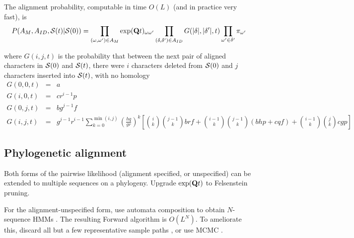 \documentclass{article}
\begin{document}
The alignment probability, computable in time $O(L)$ (and in practice very fast), is
\[
P(A_M,A_{ID},{\cal S}(t)|{\cal S}(0)) =
\prod_{(\omega,\omega') \in A_M} \exp({\bf Q}t)_{\omega \omega'}
\prod_{(\delta,\delta') \in A_{ID}} G(|\delta|,|\delta'|,t)
\prod_{\omega'\in \delta'} \pi_{\omega'}
\]

where $G(i,j,t)$ is the probability that between the next pair of aligned characters in ${\cal S}(0)$ and ${\cal S}(t)$,
there were $i$ characters deleted from ${\cal S}(0)$ 
and $j$ characters inserted into ${\cal S}(t)$,
with no homology
\begin{eqnarray*}
G(0,0,t) & = & a \\
G(i,0,t) & = & cr^{i-1}p \\
G(0,j,t) & = & bg^{j-1}f \\
G(i,j,t) & = &
g^{j-1} r^{i-1}
\sum_{k=0}^{\min(i,j)}
\left(\frac{hq}{gr}\right)^k
\left[
\binom{i}{k} \binom{j-1}{k} brf
+ \binom{i-1}{k} \binom{j-1}{k} (bhp+cqf)
+ \binom{i-1}{k} \binom{j}{k} cgp
\right]
\end{eqnarray*}

\subsection{Phylogenetic alignment}

Both forms of the pairwise likelihood (alignment specified, or unspecified) can be extended to multiple sequences on a phylogeny.
Upgrade $\exp({\bf Q}t)$ to Felsenstein pruning. %

For the alignment-unspecified form, use automata composition to obtain $N$-sequence HMMs \cite{SilvestreRyanEtAl2020}.
The resulting Forward algorithm is $O(L^N)$.
To ameliorate this, discard all but a few representative sample paths \cite{WestessonEtAl2012},
or use MCMC \cite{RedelingsSuchard2007}.



\end{document}
